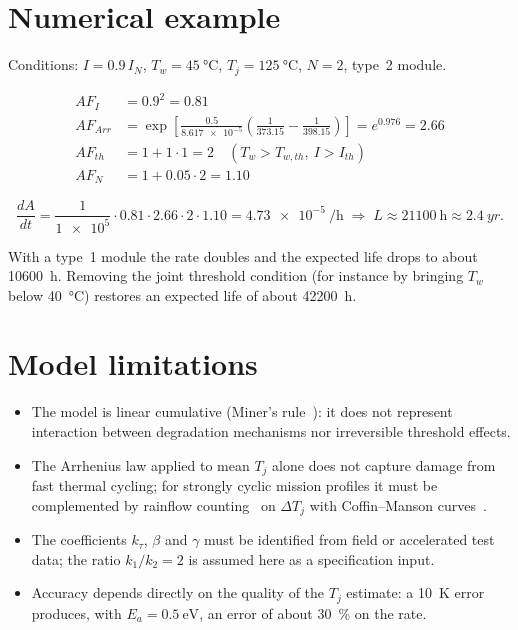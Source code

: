 \documentclass[11pt,a4paper]{article}
\begin{document}
\section{Numerical example}

Conditions: $I = 0.9\,I_N$, $T_w = \SI{45}{\degreeCelsius}$,
$T_j = \SI{125}{\degreeCelsius}$, $N = 2$, type~2 module.

\begin{align}
  AF_I    &= 0.9^{2} = 0.81 \\
  AF_{Arr}&= \exp\!\left[\frac{0.5}{\num{8.617e-5}}
             \left(\frac{1}{373.15}-\frac{1}{398.15}\right)\right]
             = e^{0.976} = 2.66 \\
  AF_{th} &= 1 + 1\cdot 1 = 2 \quad (T_w > T_{w,th},\ I > I_{th}) \\
  AF_N    &= 1 + 0.05\cdot 2 = 1.10
\end{align}

\begin{equation}
  \frac{dA}{dt} = \frac{1}{\num{1e5}}\cdot 0.81\cdot 2.66\cdot 2\cdot 1.10
  = \SI{4.73e-5}{\per\hour}
  \;\Rightarrow\;
  L \approx \SI{21100}{\hour} \approx \SI{2.4}{yr}.
\end{equation}

With a type~1 module the rate doubles and the expected life drops to about
\SI{10600}{\hour}. Removing the joint threshold condition (for instance by
bringing $T_w$ below \SI{40}{\degreeCelsius}) restores an expected life of about
\SI{42200}{\hour}.

\section{Model limitations}

\begin{itemize}
  \item The model is linear cumulative (Miner's rule~\cite{miner1945}): it does
        not represent interaction between degradation mechanisms nor
        irreversible threshold effects.
  \item The Arrhenius law applied to mean $T_j$ alone does not capture damage
        from fast thermal cycling; for strongly cyclic mission profiles it must
        be complemented by rainflow counting~\cite{downing1982,astm1049} on
        $\Delta T_j$ with Coffin--Manson
        curves~\cite{coffin1954,manson1953}.
  \item The coefficients $k_\tau$, $\beta$ and $\gamma$ must be identified from
        field or accelerated test data; the ratio $k_1/k_2 = 2$ is assumed here
        as a specification input.
  \item Accuracy depends directly on the quality of the $T_j$ estimate: a
        \SI{10}{\kelvin} error produces, with $E_a = \SI{0.5}{\electronvolt}$,
        an error of about \SI{30}{\percent} on the rate.
\end{itemize}
\end{document}
